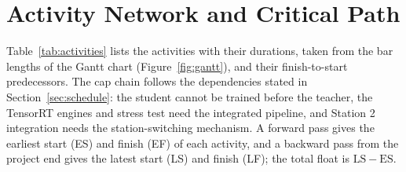 \section{Activity Network and Critical Path}
\label{sec:cpm}
Table~\ref{tab:activities} lists the activities with their durations, taken from the bar lengths of the Gantt chart (Figure~\ref{fig:gantt}), and their finish-to-start predecessors. The cap chain follows the dependencies stated in Section~\ref{sec:schedule}: the student cannot be trained before the teacher, the TensorRT engines and stress test need the integrated pipeline, and Station 2 integration needs the station-switching mechanism. A forward pass gives the earliest start (ES) and finish (EF) of each activity, and a backward pass from the project end gives the latest start (LS) and finish (LF); the total float is $\mathrm{LS}-\mathrm{ES}$.

